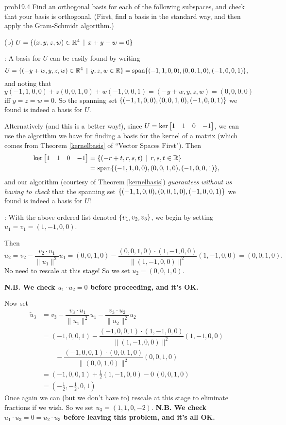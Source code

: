 \begin{sol}{prob19.4} Find an orthogonal basis for each of the following subspaces, and check that your basis is orthogonal. (First, find a basis in the standard way, and then apply the Gram-Schmidt algorithm.)
\medskip

(b) $U=\{(x,y,z, w)\in\mathbb{R}^4 \,\mid \, x+y-w=0 \}$

\soln {}: A basis for $U$ can be easily found by writing
$$U=\{(-y+w,y,z, w)\in\mathbb{R}^4 \,\mid \, y,z,w\in \mathbb{R} \}=\textrm{span}\{(-1,1,0,0),(0,0,1,0),(-1,0,0,1)\},$$ and noting that 
$ y(-1,1,0,0)+z(0,0,1,0)+w(-1,0,0,1)=(-y+w,y,z, w)=(0,0,0,0)$ iff  $y=z=w=0$. So the spanning set $\{(-1,1,0,0),(0,0,1,0),(-1,0,0,1) \}$ we found is indeed a basis for $U$. 

Alternatively (and this is a better way!), since $U=\ker \bmatrix 1&1&0&-1 \endbmatrix$, we can use the algorithm we have for finding a basis for the kernel of a matrix (which comes from Theorem \ref{kernelbasis} of ``Vector Spaces First"). Then
\begin{align*}\ker \bmatrix 1&1&0&-1 \endbmatrix &=\set{(-r+t,r,s,t)\st r,s,t \in \R }\\&=\spn\{(-1,1,0,0),(0,0,1,0),(-1,0,0,1)\},\end{align*} and our algorithm (courtesy of Theorem \ref{kernelbasis}) {\it guarantees without us having to check} that the spanning set $\{(-1,1,0,0),(0,0,1,0),(-1,0,0,1) \}$ we found is indeed a basis for $U$!

\smallskip
{}: With the above ordered list denoted $\{v_1, v_2, v_3 \}$, we begin by setting $u_1=v_1=(1, -1, 0, 0)$. 

Then $$\tilde u_2= v_2 -\dfrac{v_2\cdot u_1}{\| u_1\|^2}u_1=(0,0,1,0)-\dfrac{(0,0,1,0)\cdot (1, -1, 0, 0)}{\| (1, -1, 0, 0)\|^2}(1, -1, 0, 0)=(0,0,1,0).$$ No need to rescale at this stage! So we set $u_2=(0,0,1,0)$. 

{\bf N.B. We check $u_1\cdot u_2=0$ before proceeding, and it's OK.}

Now set 
\begin{align*}
 \tilde u_3 &=v_3 -\dfrac{v_3\cdot u_1}{\| u_1\|^2}u_1-\dfrac{v_3\cdot u_2}{\| u_2\|^2}u_2 \\
  &= (-1,0,0,1)-\dfrac{(-1,0,0,1)\cdot (1, -1, 0, 0)}{\| (1, -1, 0, 0)\|^2}(1, -1, 0, 0)\\
&\qquad-\dfrac{(-1,0,0,1)\cdot (0,0,1,0)}{\| (0,0,1,0)\|^2}(0,0,1,0)\\
  &=(-1,0,0,1)+\frac12 (1, -1, 0, 0)-0\,(0,0,1,0)\\
  &= (-\frac12,-\frac12  , 0 ,1 )\end{align*}
Once again we can (but we don't have to) rescale at this stage to eliminate fractions if we wish. So we set $u_3=(1,1,0,-2)$. 
 {\bf N.B. We check $u_1\cdot u_3=0=u_2\cdot u_3$ before leaving this problem, and it's all OK.}


\end{sol}
